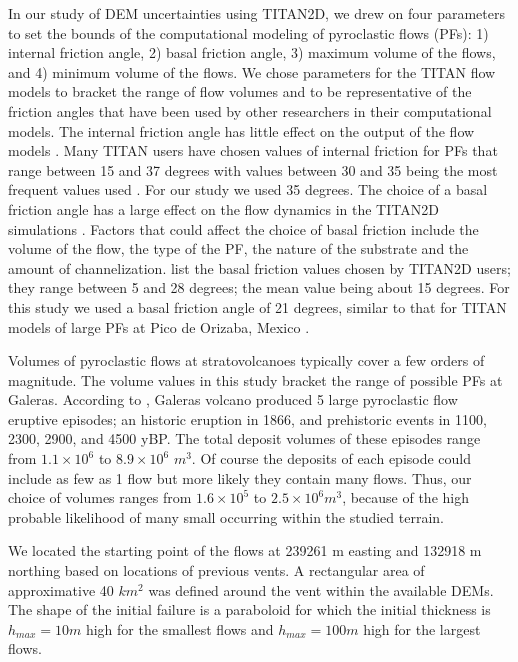 \documentclass[a4paper,fleqn]{article}
\begin{document}
In our study of DEM uncertainties using TITAN2D, we drew on four
parameters to set the bounds of the computational modeling of
pyroclastic flows (PFs): 1) internal friction angle, 2) basal friction
angle, 3) maximum volume of the flows, and 4) minimum volume of the
flows. We chose parameters for the TITAN flow models to bracket the
range of flow volumes and to be representative of the friction angles
that have been used by other researchers in their computational models.  The internal
friction angle has little effect on the output of the
flow models \citep{Keith, sheridan_2005}. Many TITAN users have chosen
values of internal friction for PFs that range between 15 and 37
degrees with values between 30 and 35 being the most frequent values used
\citep{Patra2005, murcia_2010}. For our study we used 35 degrees.  The
choice of a basal friction angle has a large effect on the flow
dynamics in the TITAN2D simulations \citep{Patra2005,
  stinton_2006}. Factors that could affect the choice of basal
friction include the volume of the flow, the type of the PF, the
nature of the substrate and the amount of
channelization. \citet{murcia_2010} list the basal friction values
chosen by TITAN2D users; they range between 5 and 28 degrees; the mean
value being about 15 degrees. For this study we used a basal friction
angle of 21 degrees, similar to that for TITAN models of large PFs at
Pico de Orizaba, Mexico \citep{sheridan_2010}.
 
Volumes of pyroclastic flows at stratovolcanoes typically cover a few
orders of magnitude. The volume values in this study bracket the range
of possible PFs at Galeras. According to \citet{calvache_1990a},
Galeras volcano produced 5 large pyroclastic flow eruptive episodes;
an historic eruption in 1866, and prehistoric events in 1100, 2300,
2900, and 4500 yBP.  The total deposit volumes of these episodes range
from $1.1 \times 10^6$ to $8.9 \times 10^6$ $m^3$. Of course the deposits of
each episode could include as few as 1 flow but more likely they contain many flows. Thus, our choice of volumes ranges from $1.6 \times 10^5$ to $2.5
\times 10^6 m^3$, because of the high probable likelihood of many small occurring within the studied terrain.

We located the starting point of the flows at 239261 m easting and
132918 m northing based on locations of previous vents. A
rectangular area of approximative 40 $km^2$ was defined around
the vent within the available DEMs.  The shape of the initial failure
is a paraboloid for which the initial  thickness is
$h_{max}= 10m$ high for the smallest flows and $h_{max} = 100m$ high for the largest flows.
 
\end{document}
